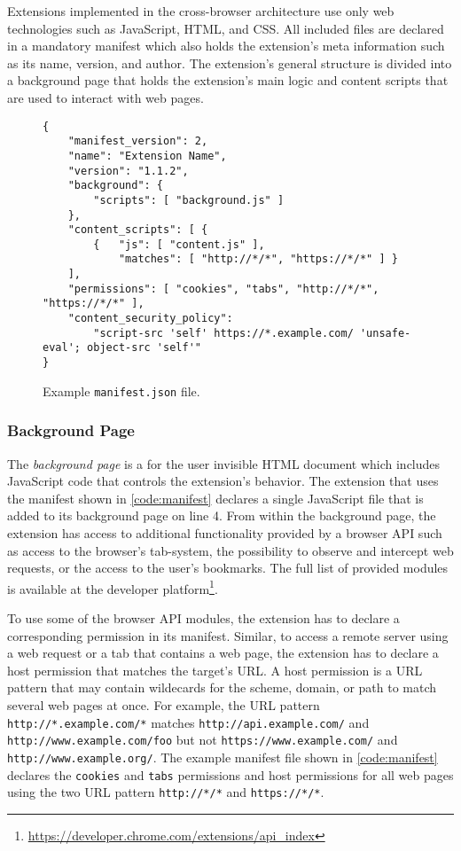 	Extensions implemented in the cross-browser architecture use only web technologies such as JavaScript, HTML, and CSS. All included files are declared in a mandatory manifest which also holds the extension's meta information such as its name, version, and author. The extension's general structure is divided into a background page that holds the extension's main logic and content scripts that are used to interact with web pages.
	
	\begin{figure}
		\begin{lstlisting}
{
	"manifest_version": 2,
	"name": "Extension Name",
	"version": "1.1.2",
	"background": {
		"scripts": [ "background.js" ]
	},
	"content_scripts": [ {
		{ 	"js": [ "content.js" ],
			"matches": [ "http://*/*", "https://*/*" ] }
	],
	"permissions": [ "cookies", "tabs", "http://*/*", "https://*/*" ],
	"content_security_policy": 
		"script-src 'self' https://*.example.com/ 'unsafe-eval'; object-src 'self'"
}
\end{lstlisting}
		\caption{Example \texttt{manifest.json} file.}
		\label{code:manifest}
	\end{figure}
	
\subsubsection{Background Page}

	The \textit{background page} is a for the user invisible HTML document which includes JavaScript code that controls the extension's behavior. The extension that uses the manifest shown in \autoref{code:manifest} declares a single JavaScript file that is added to its background page on line 4. From within the background page, the extension has access to additional functionality provided by a browser API such as access to the browser's tab-system, the possibility to observe and intercept web requests, or the access to the user's bookmarks. The full list of provided modules is available at the developer platform\footnote{\url{https://developer.chrome.com/extensions/api_index}}. 
	
	To use some of the browser API modules, the extension has to declare a corresponding permission in its manifest. Similar, to access a remote server using a web request or a tab that contains a web page, the extension has to declare a host permission that matches the target's URL. A host permission is a URL pattern that may contain wildecards for the scheme, domain, or path to match several web pages at once. For example, the URL pattern \texttt{http://*.example.com/*} matches \texttt{http://api.example.com/} and \texttt{http://www.example.com/foo} but not \texttt{https://www.example.com/} and \texttt{http://www.example.org/}. The example manifest file shown in \autoref{code:manifest} declares the \texttt{cookies} and \texttt{tabs} permissions and host permissions for all web pages using the two URL pattern \texttt{http://*/*} and \texttt{https://*/*}.	
	

